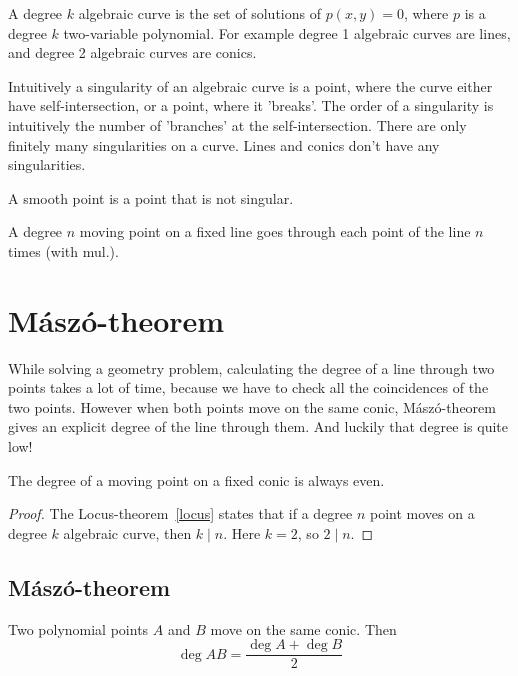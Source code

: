 \documentclass[a4paper]{article}
\begin{document}
\begin{remark}
    A degree $k$ algebraic curve is the set of solutions of $p(x,y)=0$, where $p$ is a degree $k$ two-variable polynomial. For example degree 1 algebraic curves are lines, and degree 2 algebraic curves are conics.
    
    Intuitively a singularity of an algebraic curve is a point, where the curve either have self-intersection, or a point, where it 'breaks'. The order of a singularity is intuitively the number of 'branches' at the self-intersection.
    There are only finitely many singularities on a curve.
    Lines and conics don't have any singularities.

    A smooth point is a point that is not singular.
\end{remark}
\begin{example}
    A degree $n$ moving point on a fixed line goes through each point of the line $n$ times (with mul.).
\end{example}

\section{Mászó-theorem}\label{maszo}

While solving a geometry problem, calculating the degree of a line through two points takes a lot of time, because we have to  check all the coincidences of the two points. However when both points move on the same conic, Mászó-theorem gives an explicit degree of the line through them. And luckily that degree is quite low!

\begin{lemma}
    The degree of a moving point on a fixed conic is always even.
\end{lemma}

\begin{proof}
    The Locus-theorem~\ref{locus} states that if a degree $n$ point moves on a degree $k$ algebraic curve, then $k\mid n$. Here $k=2$, so $2\mid n$.
\end{proof}

\subsection{Mászó-theorem}

\begin{theorem}
Two polynomial points $A$ and $B$ move on the same conic. Then
$$\deg AB = \frac{\deg A+\deg B}{2}$$
    
\end{theorem}
\end{document}
